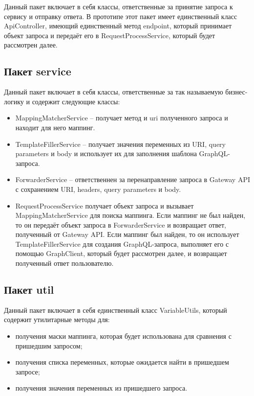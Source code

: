 Данный пакет включает в себя классы, ответственные за принятие запроса к сервису и отправку ответа.
В прототипе этот пакет имеет единственный класс ApiController, имеющий единственный метод endpoint, который принимает объект запроса и передаёт его в RequestProcessService, который будет рассмотрен далее.

\subsection{Пакет service}

Данный пакет включает в себя классы, ответственные за так называемую бизнес-логику и содержит следующие классы:

\begin{itemize}
	\item MappingMatcherService – получает метод и uri полученного запроса и находит для него маппинг.
	\item TemplateFillerService – получает значения переменных из URI, query parameters и body и использует их для заполнения шаблона GraphQL-запроса.
	\item ForwarderService – ответственнен за перенаправление запроса в Gateway API с сохранением URI, headers, query parameters и body.
	\item RequestProcessService получает объект запроса и вызывает MappingMatcherService для поиска маппинга.
	Если маппинг не был найден, то он передаёт объект запроса в ForwarderService и возвращает ответ, полученный от Gateway API. Если маппинг был найден, то он использует TemplateFillerService для создания GraphQL-запроса, выполняет его с помощью GraphClient, который будет рассмотрен далее, и возвращает полученный ответ пользователю.
\end{itemize}


\subsection{Пакет util}

Данный пакет включает в себя единственный класс VariableUtils, который содержит утилитарные методы для:

\begin{itemize}
	\item получения маски маппинга, которая будет использована для сравнения с пришедшим запросом;
	\item получения списка переменных, которые ожидается найти в пришедшем запросе;
	\item получения значения переменных из пришедшего запроса.
\end{itemize}


